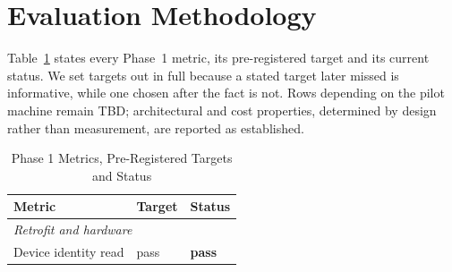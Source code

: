 \documentclass[conference]{IEEEtran}
\begin{document}
\section{Evaluation Methodology}
\label{sec:eval}

Table~\ref{tab:eval} states every Phase~1 metric, its pre-registered target
and its current status. We set targets out in full because a stated target
later missed is informative, while one chosen after the fact is not. Rows
depending on the pilot machine remain TBD; architectural and cost
properties, determined by design rather than measurement, are reported as
established.

\begin{table}[t]
\caption{Phase 1 Metrics, Pre-Registered Targets and Status}
\label{tab:eval}
\centering
\footnotesize
\setlength{\tabcolsep}{3pt}
\begin{tabular}{|p{3.4cm}|p{1.9cm}|p{1.4cm}|}
\hline
\textbf{Metric} & \textbf{Target} & \textbf{Status} \\
\hline
\multicolumn{3}{|l|}{\emph{Retrofit and hardware}} \\
\hline
Device identity read & pass & \textbf{pass} \\


\end{tabular}
\end{table}
\end{document}
